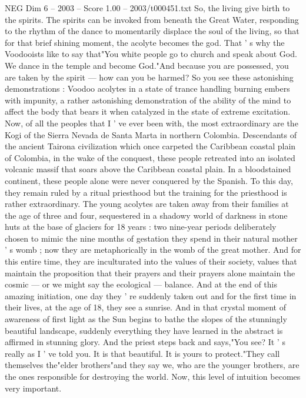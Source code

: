 \begin{textsample}{NEG Dim 6 – 2003 – Score 1.00 – 2003/t000451.txt}
So, the living give birth to the spirits.
The spirits can be invoked from beneath the Great Water, responding to the rhythm of the dance to momentarily displace the soul of the living, so that for that brief shining moment, the acolyte becomes the god.
That ' s why the Voodooists like to say that"You white people go to church and speak about God.
We dance in the temple and become God."And because you are possessed, you are taken by the spirit — how can you be harmed?
So you see these astonishing demonstrations : Voodoo acolytes in a state of trance handling burning embers with impunity, a rather astonishing demonstration of the ability of the mind to affect the body that bears it when catalyzed in the state of extreme excitation.
Now, of all the peoples that I ' ve ever been with, the most extraordinary are the Kogi of the Sierra Nevada de Santa Marta in northern Colombia.
Descendants of the ancient Tairona civilization which once carpeted the Caribbean coastal plain of Colombia, in the wake of the conquest, these people retreated into an isolated volcanic massif that soars above the Caribbean coastal plain.
In a bloodstained continent, these people alone were never conquered by the Spanish.
To this day, they remain ruled by a ritual priesthood but the training for the priesthood is rather extraordinary.
The young acolytes are taken away from their families at the age of three and four, sequestered in a shadowy world of darkness in stone huts at the base of glaciers for 18 years : two nine-year periods deliberately chosen to mimic the nine months of gestation they spend in their natural mother ' s womb ; now they are metaphorically in the womb of the great mother.
And for this entire time, they are inculturated into the values of their society, values that maintain the proposition that their prayers and their prayers alone maintain the cosmic — or we might say the ecological — balance.
And at the end of this amazing initiation, one day they ' re suddenly taken out and for the first time in their lives, at the age of 18, they see a sunrise.
And in that crystal moment of awareness of first light as the Sun begins to bathe the slopes of the stunningly beautiful landscape, suddenly everything they have learned in the abstract is affirmed in stunning glory.
And the priest steps back and says,"You see?
It ' s really as I ' ve told you.
It is that beautiful.
It is yours to protect."They call themselves the"elder brothers"and they say we, who are the younger brothers, are the ones responsible for destroying the world.
Now, this level of intuition becomes very important.

\end{textsample}
